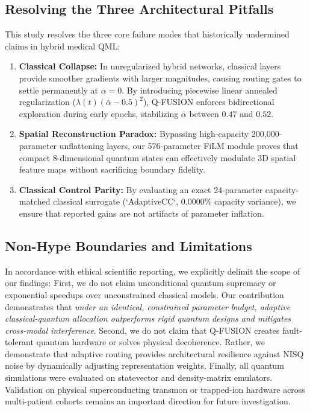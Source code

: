 \subsection{Resolving the Three Architectural Pitfalls}
This study resolves the three core failure modes that historically undermined claims in hybrid medical QML:
\begin{enumerate}
    \item \textbf{Classical Collapse:} In unregularized hybrid networks, classical layers provide smoother gradients with larger magnitudes, causing routing gates to settle permanently at $\alpha = 0$. By introducing piecewise linear annealed regularization ($\lambda(t)(\bar{\alpha}-0.5)^2$), Q-FUSION enforces bidirectional exploration during early epochs, stabilizing $\bar{\alpha}$ between $0.47$ and $0.52$.
    \item \textbf{Spatial Reconstruction Paradox:} Bypassing high-capacity 200,000-parameter unflattening layers, our 576-parameter FiLM module proves that compact 8-dimensional quantum states can effectively modulate 3D spatial feature maps without sacrificing boundary fidelity.
    \item \textbf{Classical Control Parity:} By evaluating an exact 24-parameter capacity-matched classical surrogate (`AdaptiveCC`, 0.0000\% capacity variance), we ensure that reported gains are not artifacts of parameter inflation.
\end{enumerate}

\subsection{Non-Hype Boundaries and Limitations}
In accordance with ethical scientific reporting, we explicitly delimit the scope of our findings:
First, we do not claim unconditional quantum supremacy or exponential speedups over unconstrained classical models. Our contribution demonstrates that \textit{under an identical, constrained parameter budget, adaptive classical-quantum allocation outperforms rigid quantum designs and mitigates cross-modal interference}.
Second, we do not claim that Q-FUSION creates fault-tolerant quantum hardware or solves physical decoherence. Rather, we demonstrate that adaptive routing provides architectural resilience against NISQ noise by dynamically adjusting representation weights.
Finally, all quantum simulations were evaluated on statevector and density-matrix emulators. Validation on physical superconducting transmon or trapped-ion hardware across multi-patient cohorts remains an important direction for future investigation.
